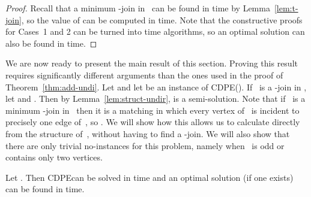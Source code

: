 \documentclass[11pt]{llncs}
\newcommand{\cdpe}{{\sc CDPE}}
\begin{document}
\begin{proof}
\medskip
\noindent
Recall that a minimum -join in~ can be found in  time by
Lemma~\ref{lem:t-join}, so the value of  can be computed in
 time. Note that the constructive proofs for Cases~1 and 2 can be
turned into
 time algorithms, so an optimal solution  can also be found in
 time.
\end{proof}


We are now ready to present the main result of this section. 
Proving this result requires significantly different arguments than the ones used in the proof of Theorem~\ref{thm:add-undi}.
Let  and let  be an instance of \cdpe(). If~
is a -join in , let  and . Then by
Lemma~\ref{lem:struct-undir},  is a semi-solution.  Note that if~ is
a minimum -join in~ then it is a matching in which every vertex of~
is incident to precisely one edge of~, so . We will show
how this allows us to calculate  directly from the structure
of~, without having to find a -join. We will also show that there are
only trivial no-instances for this problem,
namely when~ is odd or~ contains only two vertices.

\begin{theorem}\label{thm:edit-undir}
Let . Then \cdpe can be solved in  time and an
optimal solution (if one exists) can be found in  time.
\end{theorem}
\end{document}
